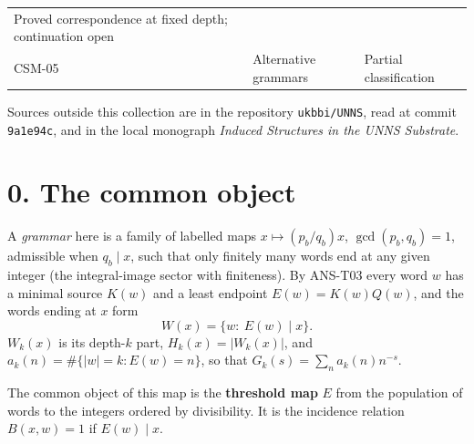 \documentclass[
  11pt,
]{article}
\begin{document}
\begin{longtable}[]{@{}lll@{}}
\begin{minipage}[t]{0.43\columnwidth}
Proved correspondence at fixed depth; continuation open\strut
\end{minipage}\tabularnewline
\begin{minipage}[t]{0.14\columnwidth}\raggedright
CSM-05\strut
\end{minipage} & \begin{minipage}[t]{0.34\columnwidth}\raggedright
Alternative grammars\strut
\end{minipage} & \begin{minipage}[t]{0.43\columnwidth}\raggedright
Partial classification\strut
\end{minipage}\tabularnewline
\bottomrule
\end{longtable}

Sources outside this collection are in the repository
\texttt{ukbbi/UNNS}, read at commit \texttt{9a1e94c}, and in the local
monograph \emph{Induced Structures in the UNNS Substrate}.

\hypertarget{the-common-object}{%
\section{0. The common object}\label{the-common-object}}

A \emph{grammar} here is a family of labelled maps
\(x\mapsto (p_b/q_b)x\), \(\gcd(p_b,q_b)=1\), admissible when
\(q_b\mid x\), such that only finitely many words end at any given
integer (the integral-image sector with finiteness). By ANS-T03 every
word \(w\) has a minimal source \(K(w)\) and a least endpoint
\(E(w)=K(w)Q(w)\), and the words ending at \(x\) form
\[W(x)=\{w:\ E(w)\mid x\}.\] \(W_k(x)\) is its depth-\(k\) part,
\(H_k(x)=|W_k(x)|\), and \(a_k(n)=\#\{|w|=k: E(w)=n\}\), so that
\(G_k(s)=\sum_na_k(n)n^{-s}\).

The common object of this map is the \textbf{threshold map} \(E\) from
the population of words to the integers ordered by divisibility. It is
the incidence relation \(B(x,w)=1\) if \(E(w)\mid x\).

\begin{center}
\end{center}
\end{document}
